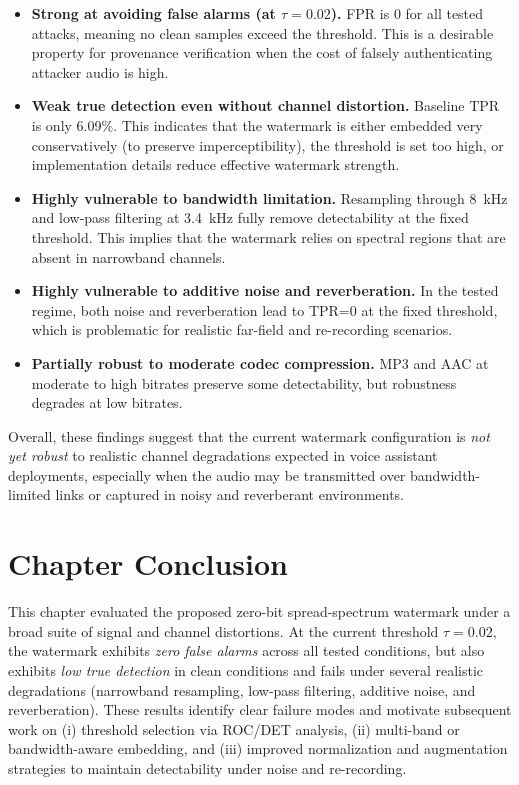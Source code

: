\begin{itemize}
    \item \textbf{Strong at avoiding false alarms (at $\tau=0.02$).} FPR is 0 for
    all tested attacks, meaning no clean samples exceed the threshold. This is a
    desirable property for provenance verification when the cost of falsely
    authenticating attacker audio is high.
    \item \textbf{Weak true detection even without channel distortion.} Baseline
    TPR is only 6.09\%. This indicates that the watermark is either embedded very
    conservatively (to preserve imperceptibility), the threshold is set too high,
    or implementation details reduce effective watermark strength.
    \item \textbf{Highly vulnerable to bandwidth limitation.} Resampling through
    8~kHz and low-pass filtering at 3.4~kHz fully remove detectability at the
    fixed threshold. This implies that the watermark relies on spectral regions
    that are absent in narrowband channels.
    \item \textbf{Highly vulnerable to additive noise and reverberation.} In the
    tested regime, both noise and reverberation lead to TPR=0 at the fixed
    threshold, which is problematic for realistic far-field and re-recording
    scenarios.
    \item \textbf{Partially robust to moderate codec compression.} MP3 and AAC
    at moderate to high bitrates preserve some detectability, but robustness
    degrades at low bitrates.
\end{itemize}

Overall, these findings suggest that the current watermark configuration is
\emph{not yet robust} to realistic channel degradations expected in voice
assistant deployments, especially when the audio may be transmitted over
bandwidth-limited links or captured in noisy and reverberant environments.

\section{Chapter Conclusion}
\label{sec:wm-chapter-conclusion}

This chapter evaluated the proposed zero-bit spread-spectrum watermark under a
broad suite of signal and channel distortions. At the current threshold
$\tau=0.02$, the watermark exhibits \emph{zero false alarms} across all tested
conditions, but also exhibits \emph{low true detection} in clean conditions and
fails under several realistic degradations (narrowband resampling, low-pass
filtering, additive noise, and reverberation). These results identify clear
failure modes and motivate subsequent work on (i) threshold selection via ROC/DET
analysis, (ii) multi-band or bandwidth-aware embedding, and (iii) improved
normalization and augmentation strategies to maintain detectability under
noise and re-recording.

